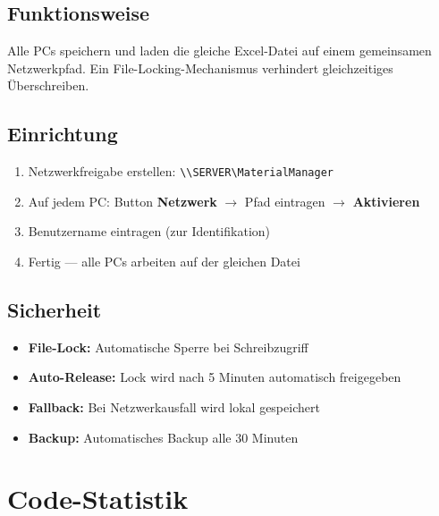 \documentclass[a4paper,12pt]{article}
\begin{document}
\subsection{Funktionsweise}

\begin{infobox}
Alle PCs speichern und laden die gleiche Excel-Datei auf einem gemeinsamen Netzwerkpfad. Ein File-Locking-Mechanismus verhindert gleichzeitiges Überschreiben.
\end{infobox}

\subsection{Einrichtung}

\begin{enumerate}
    \item Netzwerkfreigabe erstellen: \texttt{\textbackslash\textbackslash SERVER\textbackslash MaterialManager}
    \item Auf jedem PC: Button \textbf{Netzwerk} $\rightarrow$ Pfad eintragen $\rightarrow$ \textbf{Aktivieren}
    \item Benutzername eintragen (zur Identifikation)
    \item Fertig — alle PCs arbeiten auf der gleichen Datei
\end{enumerate}

\subsection{Sicherheit}

\begin{itemize}
    \item \textbf{File-Lock:} Automatische Sperre bei Schreibzugriff
    \item \textbf{Auto-Release:} Lock wird nach 5 Minuten automatisch freigegeben
    \item \textbf{Fallback:} Bei Netzwerkausfall wird lokal gespeichert
    \item \textbf{Backup:} Automatisches Backup alle 30 Minuten
\end{itemize}

\section{Code-Statistik}
\end{document}
